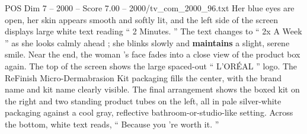 \begin{textsample}{POS Dim 7 – 2000 – Score 7.00 – 2000/tv\_com\_2000\_96.txt}
Her blue eyes are open, her skin appears smooth and softly lit, and the left side of the screen displays large white text reading “ 2 Minutes. ” The text changes to “ 2x A Week ” as she looks calmly ahead ; she blinks slowly and \textbf{maintains} a slight, serene smile.
Near the end, the woman ’s face fades into a close view of the product box again.
The top of the screen shows the large spaced-out “ L’ORÉAL ” logo.
The ReFinish Micro-Dermabrasion Kit packaging fills the center, with the brand name and kit name clearly visible.
The final arrangement shows the boxed kit on the right and two standing product tubes on the left, all in pale silver-white packaging against a cool gray, reflective bathroom-or-studio-like setting.
Across the bottom, white text reads, “ Because you ’re worth it. ”

\end{textsample}
